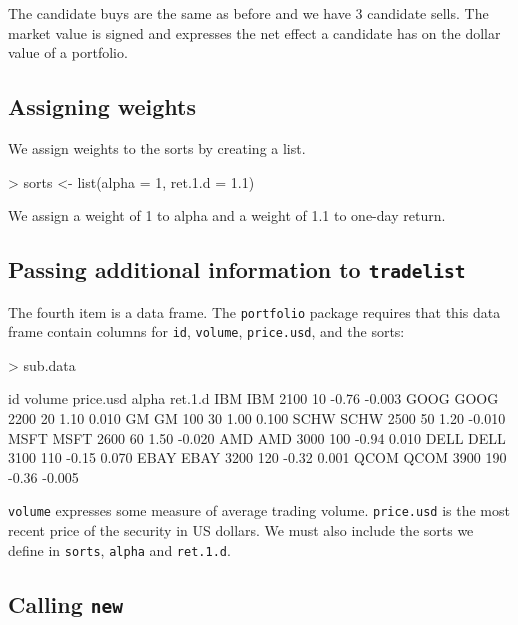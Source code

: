 \documentclass{article}
\begin{document}
The candidate buys are the same as before and we have 3 candidate
sells.  The market value is signed and expresses the net effect a
candidate has on the dollar value of a portfolio.  

\subsection{Assigning weights}

We assign weights to the sorts by creating a list.

\begin{Schunk}
\begin{Sinput}
> sorts <- list(alpha = 1, ret.1.d = 1.1)
\end{Sinput}
\end{Schunk}

We assign a weight of 1 to alpha and a weight of 1.1 to one-day
return.

\subsection{Passing additional information to \texttt{tradelist}}
\label{paitt}

The fourth item is a data frame.  The \texttt{portfolio} package
requires that this data frame contain columns for \texttt{id},
\texttt{volume}, \texttt{price.usd}, and the sorts:


\begin{Schunk}
\begin{Sinput}
> sub.data
\end{Sinput}
\begin{Soutput}
       id volume price.usd alpha ret.1.d
IBM   IBM   2100        10 -0.76  -0.003
GOOG GOOG   2200        20  1.10   0.010
GM     GM    100        30  1.00   0.100
SCHW SCHW   2500        50  1.20  -0.010
MSFT MSFT   2600        60  1.50  -0.020
AMD   AMD   3000       100 -0.94   0.010
DELL DELL   3100       110 -0.15   0.070
EBAY EBAY   3200       120 -0.32   0.001
QCOM QCOM   3900       190 -0.36  -0.005
\end{Soutput}
\end{Schunk}

\texttt{volume} expresses some measure of average trading volume.
\texttt{price.usd} is the most recent price of the security in US
dollars. We must also include the sorts we define in \texttt{sorts},
\texttt{alpha} and \texttt{ret.1.d}.

\subsection{Calling \texttt{new}}
\label{lo new}
\end{document}
